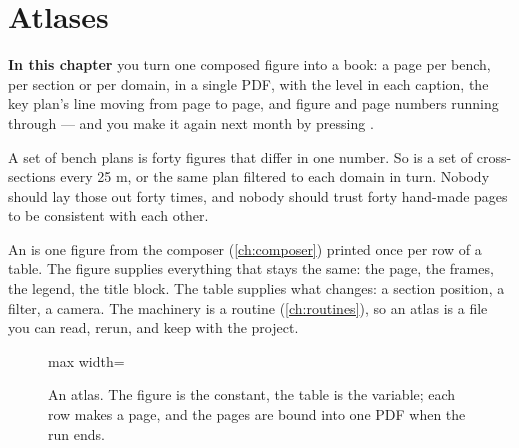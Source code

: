 \chapter{Atlases}\label{ch:atlas}
\begin{goals}
\textbf{In this chapter} you turn one composed figure into a book: a page per bench, per section or per domain, in a single PDF, with the level in each caption, the key plan's line moving from page to page, and figure and page numbers running through — and you make it again next month by pressing .
\end{goals}

A set of bench plans is forty figures that differ in one number. So is a set of cross-sections every 25 m, or the same plan filtered to each domain in turn. Nobody should lay those out forty times, and nobody should trust forty hand-made pages to be consistent with each other.

An  is one figure from the composer (\cref{ch:composer}) printed once per row of a table. The figure supplies everything that stays the same: the page, the frames, the legend, the title block. The table supplies what changes: a section position, a filter, a camera. The machinery is a routine (\cref{ch:routines}), so an atlas is a file you can read, rerun, and keep with the project.

\begin{figure}[htbp]\centering
\begin{adjustbox}{max width=\linewidth}\end{adjustbox}
\caption{An atlas. The figure is the constant, the table is the variable; each row makes a page, and the pages are bound into one PDF when the run ends.}\label{fig:atlas-flow}
\end{figure}

